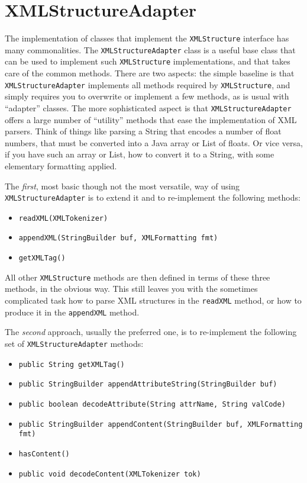\section{XMLStructureAdapter}

The implementation of classes that implement the \verb#XMLStructure# interface has many commonalities. The \verb#XMLStructureAdapter# class
is a useful base class that can be used to implement such \verb#XMLStructure# implementations, and that takes care of the common methods.
There are two aspects: the simple baseline is that \verb#XMLStructureAdapter# implements all methods required by \verb#XMLStructure#,
and simply requires you to overwrite or implement a few methods, as is usual with ``adapter'' classes. The more sophisticated aspect is
that \verb#XMLStructureAdapter# offers a large number of ``utility'' methods that ease the implementation of XML parsers. 
Think of things like parsing a String that encodes a number of float numbers, that must be converted into a Java array or List of floats.
Or vice versa, if you have such an array or List, how to convert it to a String, with some elementary formatting applied.

\noindent
The \emph{first}, most basic though not the most versatile, way of using \verb#XMLStructureAdapter# is to extend it and to re-implement the following methods:
%
\begin{itemize}
\item \verb#readXML(XMLTokenizer)#
\item \verb#appendXML(StringBuilder buf, XMLFormatting fmt)#
\item \verb#getXMLTag()#
\end{itemize}
%
All other \verb#XMLStructure# methods are then defined in terms of these three methods, in the obvious way.
This still leaves you with the sometimes complicated task how to parse XML structures in the \verb#readXML# method,
or how to produce it in the \verb#appendXML# method.  

\noindent
The \emph{second} approach, usually the preferred one, is to re-implement
the following set of \verb#XMLStructureAdapter# methods:
%
\begin{itemize}
\item \verb#public String getXMLTag()#
\item \verb#public StringBuilder appendAttributeString(StringBuilder buf)#
\item \verb#public boolean decodeAttribute(String attrName, String valCode)#
\item \verb#public StringBuilder appendContent(StringBuilder buf, XMLFormatting fmt)#
\item \verb#hasContent()#
\item \verb#public void decodeContent(XMLTokenizer tok)#
\end{itemize}
%






